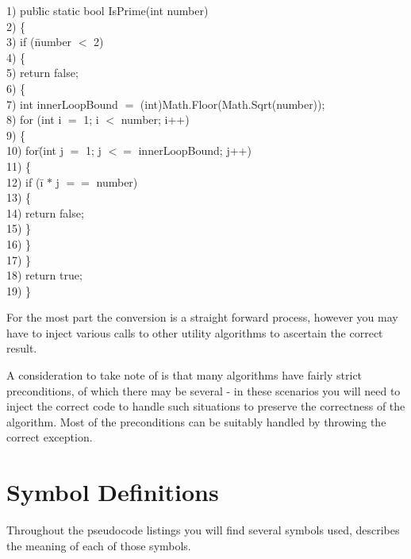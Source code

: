 \documentclass[10pt,oneside,a4paper]{report}
\begin{document}
\begin{tabbing}
1) pub\=lic static bool IsPrime(int number) \\
2) \{ \\
3) \> if (\=number $<$ 2) \\
4) \> \{ \\
5) \> \> return false; \\
6) \> \{ \\ 
7) \> int innerLoopBound $=$ (int)Math.Floor(Math.Sqrt(number)); \\
8) \> for (int i $=$ 1; i $<$ number; i++) \\
9) \> \{ \\
10) \> \> for\= (int j $=$ 1; j $<=$ innerLoopBound; j++) \\
11) \> \> \{ \\
12) \> \> \> if (\=i $*$ j $==$ number) \\
13) \> \> \> \{ \\
14) \> \> \> \> return false; \\
15) \> \> \> \} \\
16) \> \> \} \\
17) \> \} \\
18) \> return true; \\
19) \} \\
\end{tabbing}

For the most part the conversion is a straight forward process, however you may have to inject various calls to other utility algorithms to ascertain the correct result.

A consideration to take note of is that many algorithms have fairly strict preconditions, of which there may be several - in these scenarios you will need to inject the correct code to handle such situations to preserve the correctness of the algorithm. Most of the preconditions can be suitably handled by throwing the correct exception.

\chapter{Symbol Definitions}
Throughout the pseudocode listings you will find several symbols used,  describes the meaning of each of those symbols.
\end{document}
